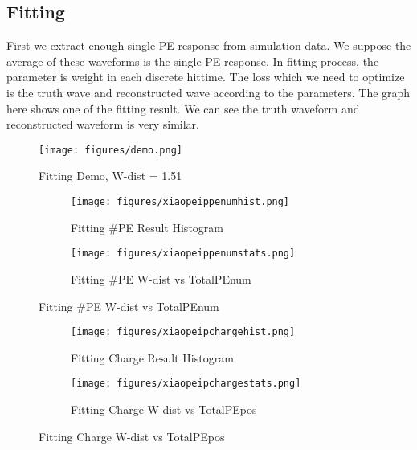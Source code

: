 \subsection{Fitting}
First we extract enough single PE response from simulation data. We suppose the average of these waveforms is the single PE response. In fitting process, the parameter is weight in each discrete hittime. The loss which we need to optimize is the truth wave and reconstructed wave according to the parameters. The graph here shows one of the fitting result. We can see the truth waveform and reconstructed waveform is very similar. 

\begin{figure}
    \centering
    \caption{Fitting Demo, W-dist = 1.51}
    \texttt{[image: figures/demo.png]}
\end{figure}

\begin{figure}[H]
\begin{minipage}{.5\textwidth}
\begin{figure}[H]
    \centering
        \texttt{[image: figures/xiaopeippenumhist.png]}
    \caption{Fitting \#PE Result Histogram}
\end{figure}
\end{minipage}
\begin{minipage}{.5\textwidth}
\begin{figure}[H]
    \centering
        \texttt{[image: figures/xiaopeippenumstats.png]}
    \caption{Fitting \#PE W-dist vs TotalPEnum}
\end{figure}
\end{minipage}
\end{figure}
\begin{figure}[H]
\begin{minipage}{.5\textwidth}
\begin{figure}[H]
    \centering
        \texttt{[image: figures/xiaopeipchargehist.png]}
    \caption{Fitting Charge Result Histogram}
\end{figure}
\end{minipage}
\begin{minipage}{.5\textwidth}
\begin{figure}[H]
    \centering
        \texttt{[image: figures/xiaopeipchargestats.png]}
    \caption{Fitting Charge W-dist vs TotalPEpos}
\end{figure}
\end{minipage}
\end{figure}

